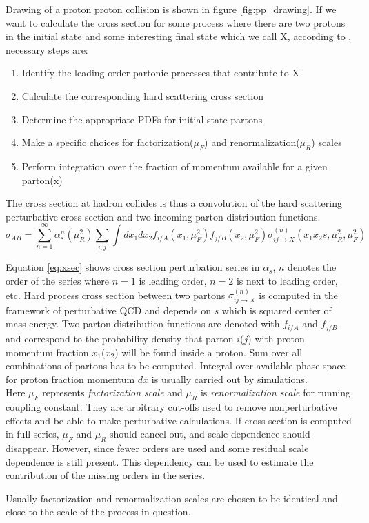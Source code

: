 Drawing of a proton proton collision is shown in figure \ref{fig:pp_drawing}. If we want to calculate the cross section for some process where there are two protons in the initial state and some interesting final state which we call X, according to \cite{Campbell:2006wx}, necessary steps are:
\begin{enumerate}
	\item Identify the leading order partonic processes that contribute to X
	\item Calculate the corresponding hard scattering cross section
	\item Determine the appropriate PDFs for initial state partons
	\item Make a specific choices for factorization($\mu_F$) and renormalization($\mu_R$) scales
	\item Perform integration over the fraction of momentum available for a given parton(x)  
\end{enumerate}
The cross section at hadron collides is thus a convolution of the hard scattering perturbative cross section and two incoming parton distribution functions.
\begin{equation}
\sigma_{AB} = \sum\limits_{n=1}^{\infty} \alpha_{s}^{n}(\mu_{R}^2)\sum\limits_{i,j} \int dx_1 dx_2 f_{i/A}(x_1,\mu_{F}^2) f_{j/B}(x_2,\mu_{F}^2) \sigma_{ij \rightarrow X}^{(n)}(x_1 x_2s,\mu_{R}^2,\mu_{F}^2)
 \label{eq:xsec}
\end{equation} 
\par Equation \ref{eq:xsec} shows cross section perturbation series in $\alpha_s$, $n$ denotes the order of the series where $n=1$ is leading order, $n=2$ is next to leading order, etc. 
Hard process cross section between two partons $\sigma_{ij \rightarrow X}^{(n)}$ is computed in the framework of perturbative QCD and depends on $s$ which is squared center of mass energy. Two parton distribution functions are denoted with $f_{i/A}$ and $f_{j/B}$ and correspond to the probability density that parton $i$($j$) with proton momentum fraction $x_1$($x_2$) will be found inside a proton. Sum over all combinations of partons has to be computed. Integral over available phase space for proton fraction momentum $dx$ is usually carried out by simulations.\\ 
Here $\mu_F$ represents \textit{factorization scale} and $\mu_R$ is \textit{renormalization scale} for running coupling constant. They are arbitrary cut-offs used to remove nonperturbative effects and be able to make perturbative calculations. If cross section is computed in full series, $\mu_F$ and $\mu_R$ should cancel out, and scale dependence should disappear. However, since fewer orders are used and some residual scale dependence is still present. This dependency can be used to estimate the contribution of the missing orders in the series.  
\par Usually factorization and renormalization scales are chosen to be identical and close to the scale of the process in question. 

